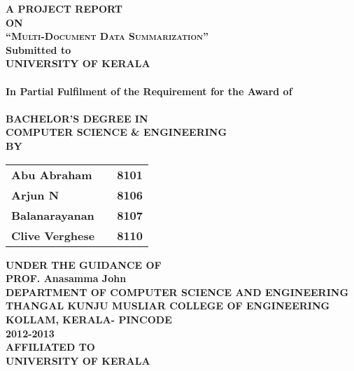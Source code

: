 \newpage
\begin{center}
\thispagestyle{empty}
\Large{\textbf{A PROJECT REPORT\\ \large{ON}}}\\[0.25cm]
\LARGE{\textsc {\textbf{``Multi-Document Data Summarization''}}}
\vspace{0.25cm}
\Large{\textbf{\\Submitted to}}
\LARGE{\textbf{\\UNIVERSITY OF KERALA\\}}
\vspace{.25cm}
\Large{\textbf{\\In Partial Fulfilment of the Requirement for the Award of\\}}
\Large{\textbf{\\BACHELOR'S DEGREE IN\\COMPUTER SCIENCE \& ENGINEERING}}
\vspace{0.25cm}
\Large{\textbf{\\BY}}\\[0.25cm]
\begin{table}[h]
\centering
\Large{
\begin{tabular}{>{\bfseries}lc>{\bfseries}r}
Abu Abraham & & 8101\\Arjun N & & 8106\\Balanarayanan & & 8107\\Clive Verghese & & 8110\\
\end{tabular}}
\end{table}
\vspace{0.25cm}
\large{\textbf{UNDER THE GUIDANCE OF}}\\
\large{\textbf{PROF. Anasamma John}}\\
\vspace{1cm}
\large{\textbf{DEPARTMENT OF COMPUTER SCIENCE AND ENGINEERING}}\\
\Large{\textbf{THANGAL KUNJU MUSLIAR COLLEGE OF ENGINEERING}}\\
\large{\textbf{KOLLAM, KERALA- PINCODE}}
\large{\textbf{\\2012-2013}}\\
\vspace{0.25cm}
\Large{\textbf{AFFILIATED TO\\}}
\LARGE{\textbf{UNIVERSITY OF KERALA}}
\newpage
\end{center}